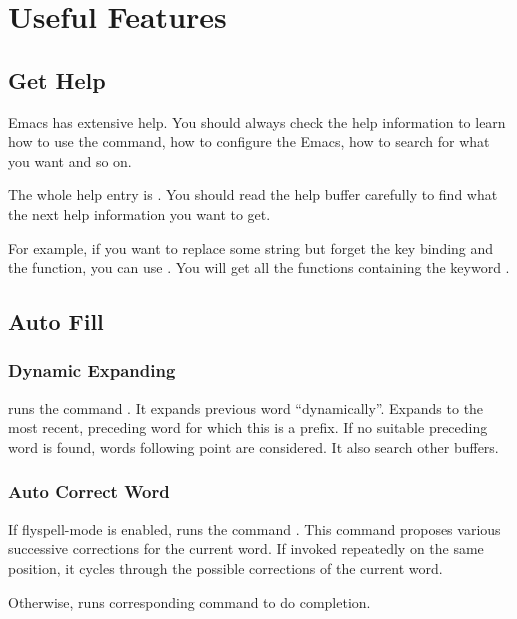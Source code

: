 
\chapter{Useful Features}
\label{cha:useful-features}

\section{Get Help}
\label{sec:get-help}

Emacs has extensive help.
You should always check the help information to learn how to use the command, how to configure the Emacs, how to search for what you want and so on.


The whole help entry is .
You should read the help buffer carefully to find what the next help information you want to get.


For example, if you want to replace some string but forget the key binding and the function, you can use . You will get all the functions containing the keyword .


\section{Auto Fill}
\label{sec:auto-fill}

\subsection{Dynamic Expanding}
\label{sec:dynamic-expanding}


 runs the command .
It expands previous word ``dynamically''.
Expands to the most recent, preceding word for which this is a prefix.
If no suitable preceding word is found, words following point are considered.
It also search other buffers.

\subsection{Auto Correct Word}
\label{sec:auto-correct-word}

If flyspell-mode is enabled,
 runs the command .
This command proposes various successive corrections for the current word.
If invoked repeatedly on the same position, it cycles through the possible corrections of the current word.

Otherwise,  runs corresponding command to do completion.

